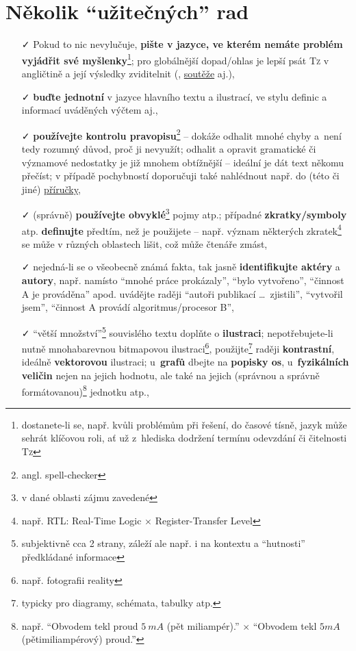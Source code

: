 \documentclass[a4paper,11pt, twoside]{report}
\begin{document}
\section*{Několik ``užitečných'' rad}

\begin{itemize}
\item[\faCheck]
Pokud to nic nevylučuje, 
\textbf{pište v jazyce, ve kterém nemáte problém vyjádřit své myšlenky}\footnote{dostanete-li se, např. kvůli problémům při řešení, do časové tísně, jazyk může sehrát klíčovou roli, 
ať už z~hlediska dodržení termínu odevzdání či čitelnosti \textsc{Tz}}; 
pro globálnější dopad/ohlas je lepší psát \textsc{Tz} v angličtině a její výsledky zviditelnit
(\href{https://github.com/}{\faGithub}, \href{https://www.vut.cz/vut}{soutěže} aj.),

\item[\faCheck]
\textbf{buďte jednotní} v jazyce hlavního textu a ilustrací, ve stylu definic a informací uváděných výčtem aj.,

\item[\faCheck]
\textbf{používejte kontrolu pravopisu}\footnote{angl. spell-checker}
-- dokáže odhalit mnohé chyby a~není tedy rozumný důvod, proč ji nevyužít;
odhalit a opravit gramatické či významové nedostatky je již mnohem obtížnější -- ideální je dát text někomu přečíst; 
v případě pochybností doporučuji také nahlédnout např. do (této či jiné) \href{https://prirucka.ujc.cas.cz/}{příručky},

\item[\faCheck] 
(správně) \textbf{používejte obvyklé}\footnote{v dané oblasti zájmu zavedené} pojmy atp.; 
případné \textbf{zkratky/symboly} atp. \textbf{definujte} předtím, než je použijete -- např. význam některých 
zkratek\footnote{např. RTL: Real-Time Logic $\times$ Register-Transfer Level} 
se může v různých oblastech lišit, což může čtenáře zmást,

\item[\faCheck] 
nejedná-li se o všeobecně známá fakta, tak jasně \textbf{identifikujte aktéry} a \textbf{autory}, 
např. namísto 
``mnohé práce prokázaly'', ``bylo vytvořeno'', ``činnost A je prováděna'' apod.
uvádějte raději 
``autoři publikací \dots ~zjistili'', ``vytvořil jsem'', ``činnost A provádí algoritmus/procesor B'',

\item[\faCheck]
``větší množství''\footnote{subjektivně cca 2 strany, záleží ale např. i na kontextu a ``hutnosti'' předkládané informace} souvislého textu doplňte o \textbf{ilustraci}; 
nepotřebujete-li nutně mnohabarevnou bitmapovou ilustraci\footnote{např. fotografii reality}, 
použijte\footnote{typicky pro diagramy, schémata, tabulky atp.} raději \textbf{kontrastní}, ideálně \textbf{vektorovou} ilustraci;
u~\textbf{grafů} dbejte na \textbf{popisky os}, 
u~\textbf{fyzikálních veličin} nejen na jejich hodnotu, ale také na jejich (správnou a správně formátovanou)\footnote{např. ``Obvodem tekl proud $5~mA$ (pět miliampér).'' $\times$ ``Obvodem tekl $5mA$ (pětimiliampérový) proud.''} 
jednotku atp.,



\end{itemize}
\end{document}
